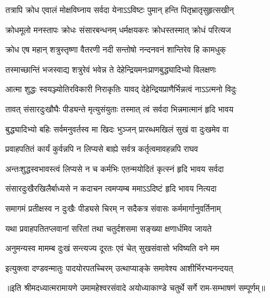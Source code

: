 \twolineshloka
{तत्रापि क्रोध एवालं मोक्षविघ्नाय सर्वदा}
{येनाऽऽविष्टः पुमान् हन्ति पितृभ्रातृसुहृत्सखीन्} %

\twolineshloka
{क्रोधमूलो मनस्तापः क्रोधः संसारबन्धनम्}
{धर्मक्षयकरः क्रोधस्तस्मात् क्रोधं परित्यज} %

\twolineshloka
{क्रोध एष महान् शत्रुस्तृष्णा वैतरणी नदी}
{सन्तोषो नन्दनवनं शान्तिरेव हि कामधुक्} %

\twolineshloka
{तस्माच्छान्तिं भजस्वाद्य शत्रुरेवं भवेन्न ते}
{देहेन्द्रियमनःप्राणबुद्ध्यादिभ्यो विलक्षणः} %

\twolineshloka
{आत्मा शुद्धः स्वयञ्ज्योतिरविकारी निराकृतिः}
{यावद् देहेन्द्रियप्राणैर्भिन्नत्वं नाऽऽत्मनो विदुः} %

\twolineshloka
{तावत् संसारदुःखौघैः पीड्यन्ते मृत्युसंयुताः}
{तस्मात् त्वं सर्वदा भिन्नमात्मानं हृदि भावय} %

\twolineshloka
{बुद्ध्यादिभ्यो बहिः सर्वमनुवर्तस्व मा खिदः}
{भुञ्जन् प्रारब्धमखिलं सुखं वा दुःखमेव वा} %

\twolineshloka
{प्रवाहपतितं कार्यं कुर्वन्नपि न लिप्यसे}
{बाह्ये सर्वत्र कर्तृत्वमावहन्नपि राघव} %

\twolineshloka
{अन्तःशुद्धस्वभावस्त्वं लिप्यसे न च कर्मभिः}
{एतन्मयोदितं कृत्स्नं हृदि भावय सर्वदा} %

\twolineshloka
{संसारदुःखैरखिलैर्बाध्यसे न कदाचन}
{त्वमप्यम्ब ममाऽऽदिष्टं हृदि भावय नित्यदा} %

\twolineshloka
{समागमं प्रतीक्षस्व न दुःखैः पीड्यसे चिरम्}
{न सदैकत्र संवासः कर्ममार्गानुवर्तिनाम्} %

\twolineshloka
{यथा प्रवाहपतितप्लवानां सरितां तथा}
{चतुर्दशसमा सङ्ख्या क्षणार्धमिव जायते} %

\twolineshloka
{अनुमन्यस्व मामम्ब दुःखं सन्त्यज्य दूरतः}
{एवं चेत् सुखसंवासो भविष्यति वने मम} %

\twolineshloka
{इत्युक्त्वा दण्डवन्मातुः पादयोरपतच्चिरम्}
{उत्थाप्याङ्के समावेश्य आशीर्भिरभ्यनन्दयत्} %

{॥इति श्रीमदध्यात्मरामायणे उमामहेश्वरसंवादे
अयोध्याकाण्डे चतुर्थे सर्गे  राम-सम्भाषणं  सम्पूर्णम्॥}
